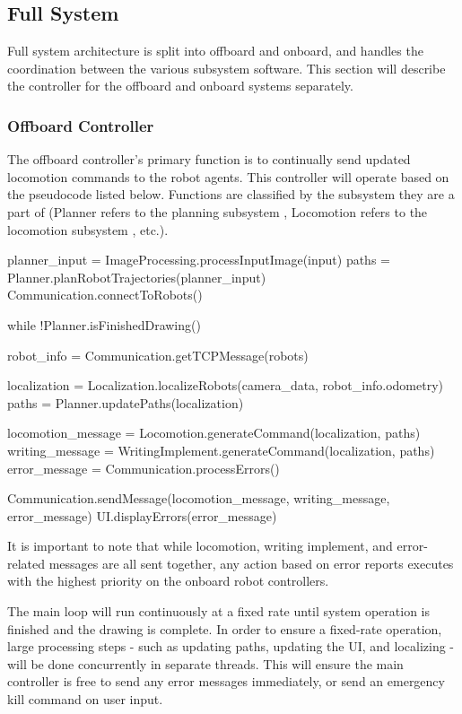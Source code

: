 
\subsection{Full System}
\label{sec:software_full_system}

Full system architecture is split into offboard and onboard, and handles the coordination between the various subsystem software. This section will describe the controller for the offboard and onboard systems separately.

\subsubsection{Offboard Controller}
\label{sec:software_full_offboard}
The offboard controller's primary function is to continually send updated locomotion commands to the robot agents. This controller will operate based on the pseudocode listed below. Functions are classified by the subsystem they are a part of (Planner refers to the planning subsystem , Locomotion refers to the locomotion subsystem , etc.).


planner_input = ImageProcessing.processInputImage(input)
paths = Planner.planRobotTrajectories(planner_input)
Communication.connectToRobots()

while !Planner.isFinishedDrawing()

  robot_info = Communication.getTCPMessage(robots)

  localization = Localization.localizeRobots(camera_data, robot_info.odometry)
  paths = Planner.updatePaths(localization)

  locomotion_message = Locomotion.generateCommand(localization, paths)
  writing_message = WritingImplement.generateCommand(localization, paths)
  error_message = Communication.processErrors()

  Communication.sendMessage(locomotion_message, writing_message, error_message)
  UI.displayErrors(error_message)


It is important to note that while locomotion, writing implement, and error-related messages are all sent together, any action based on error reports executes with the highest priority on the onboard robot controllers.

The main loop will run continuously at a fixed rate until system operation is finished and the drawing is complete. In order to ensure a fixed-rate operation, large processing steps - such as updating paths, updating the UI, and localizing - will be done concurrently in separate threads. This will ensure the main controller is free to send any error messages immediately, or send an emergency kill command on user input.


